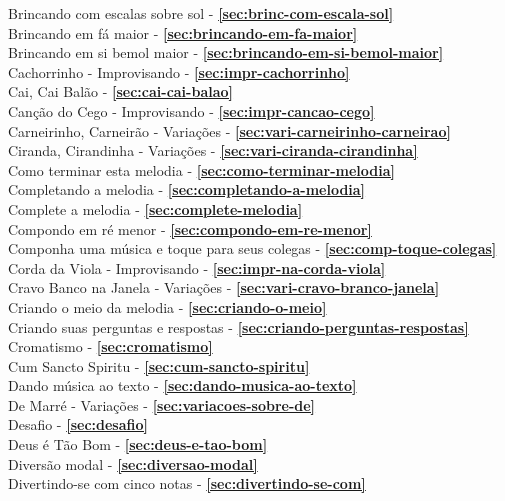 Brincando com escalas sobre sol - \textbf{\ref{sec:brinc-com-escala-sol}} \\
Brincando em fá maior - \textbf{\ref{sec:brincando-em-fa-maior}} \\
Brincando em si bemol maior - \textbf{\ref{sec:brincando-em-si-bemol-maior}} \\
Cachorrinho - Improvisando - \textbf{\ref{sec:impr-cachorrinho}} \\
Cai, Cai Balão - \textbf{\ref{sec:cai-cai-balao}} \\
Canção do Cego - Improvisando - \textbf{\ref{sec:impr-cancao-cego}} \\
Carneirinho, Carneirão - Variações - \textbf{\ref{sec:vari-carneirinho-carneirao}} \\
Ciranda, Cirandinha - Variações - \textbf{\ref{sec:vari-ciranda-cirandinha}} \\
Como terminar esta melodia - \textbf{\ref{sec:como-terminar-melodia}} \\
Completando a melodia - \textbf{\ref{sec:completando-a-melodia}} \\
Complete a melodia - \textbf{\ref{sec:complete-melodia}} \\
Compondo em ré menor - \textbf{\ref{sec:compondo-em-re-menor}} \\
Componha uma música e toque para seus colegas - \textbf{\ref{sec:comp-toque-colegas}} \\
Corda da Viola - Improvisando - \textbf{\ref{sec:impr-na-corda-viola}} \\
Cravo Banco na Janela - Variações - \textbf{\ref{sec:vari-cravo-branco-janela}} \\
Criando o meio da melodia - \textbf{\ref{sec:criando-o-meio}} \\
Criando suas perguntas e respostas - \textbf{\ref{sec:criando-perguntas-respostas}} \\
Cromatismo - \textbf{\ref{sec:cromatismo}} \\
Cum Sancto Spiritu - \textbf{\ref{sec:cum-sancto-spiritu}} \\
Dando música ao texto - \textbf{\ref{sec:dando-musica-ao-texto}} \\
De Marré - Variações - \textbf{\ref{sec:variacoes-sobre-de}} \\
Desafio - \textbf{\ref{sec:desafio}} \\
Deus é Tão Bom - \textbf{\ref{sec:deus-e-tao-bom}} \\
Diversão modal - \textbf{\ref{sec:diversao-modal}} \\
Divertindo-se com cinco notas - \textbf{\ref{sec:divertindo-se-com}} \\
